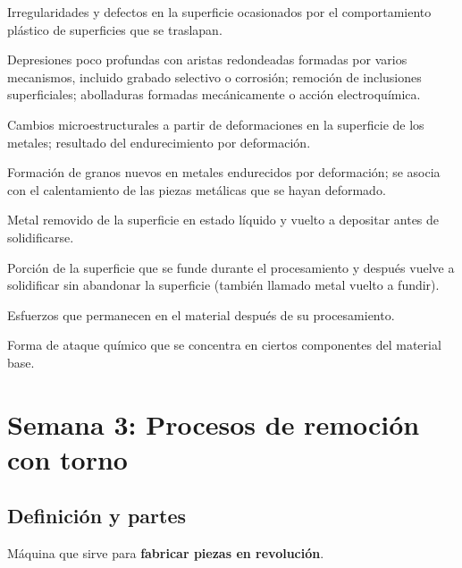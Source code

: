 \documentclass[12pt,a4paper]{article}
\begin{document}
\begin{description}[leftmargin=0pt,style=nextline]
	\item[Traslapes, pliegues y costuras] Irregularidades y defectos en la
	      superficie ocasionados por el comportamiento plástico de superficies que
	      se
	      traslapan.
	\item[Picaduras] Depresiones poco profundas con aristas redondeadas formadas
	      por varios mecanismos, incluido grabado selectivo o corrosión; remoción
	      de
	      inclusiones superficiales; abolladuras formadas mecánicamente o acción
	      electroquímica.
	\item[Deformación plástica] Cambios microestructurales a partir de
	      deformaciones en la superficie de los metales; resultado del
	      endurecimiento por
	      deformación.
	\item[Recristalización] Formación de granos nuevos en metales endurecidos por
	      deformación; se asocia con el calentamiento de las piezas metálicas que
	      se hayan
	      deformado.
	\item[Metal redepositado] Metal removido de la superficie en estado líquido y
	      vuelto a depositar antes de solidificarse.
	\item[Metal resolidificado] Porción de la superficie que se funde durante el
	      procesamiento y después vuelve a solidificar sin abandonar la superficie
	      (también llamado metal vuelto a fundir).
	\item[Esfuerzos residuales] Esfuerzos que permanecen en el material después de
	      su procesamiento.
	\item[Grabado selectivo] Forma de ataque químico que se concentra en ciertos
	      componentes del material base.
\end{description}

\newpage

\section{Semana 3: Procesos de remoción con torno}

\subsection{Definición y partes}
\begin{defi}[Torno]
	Máquina que sirve para \textbf{fabricar piezas en revolución}.
\end{defi}
\end{document}

